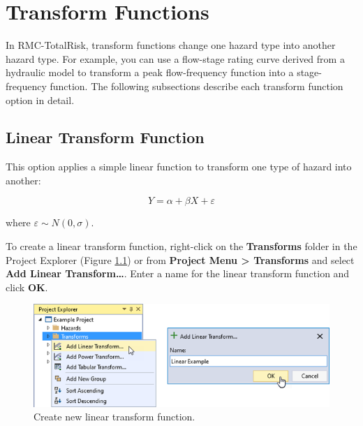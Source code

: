 \documentclass[
]{book}
\begin{document}
\hypertarget{transform-functions}{%
\chapter{Transform Functions}\label{transform-functions}}

In RMC-TotalRisk, transform functions change one hazard type into another hazard type. For example, you can use a flow-stage rating curve derived from a hydraulic model to transform a peak flow-frequency function into a stage-frequency function. The following subsections describe each transform function option in detail.

\hypertarget{linear-transform-function}{%
\section{Linear Transform Function}\label{linear-transform-function}}

This option applies a simple linear function to transform one type of hazard into another:

\begin{equation}
    Y = \alpha + \beta X + \varepsilon
    \label{eq:linear}
\end{equation}

where \(\varepsilon \sim N(0, \sigma)\).

To create a linear transform function, right-click on the \textbf{Transforms} folder in the Project Explorer (Figure \ref{fig:figure-74}) or from \textbf{Project Menu \textgreater{} Transforms} and select \textbf{Add Linear Transform\ldots{}}. Enter a name for the linear transform function and click \textbf{OK}.

\begin{figure}

{\centering \includegraphics{images/figure74} 

}

\caption{Create new linear transform function.}\label{fig:figure-74}
\end{figure}
\end{document}
